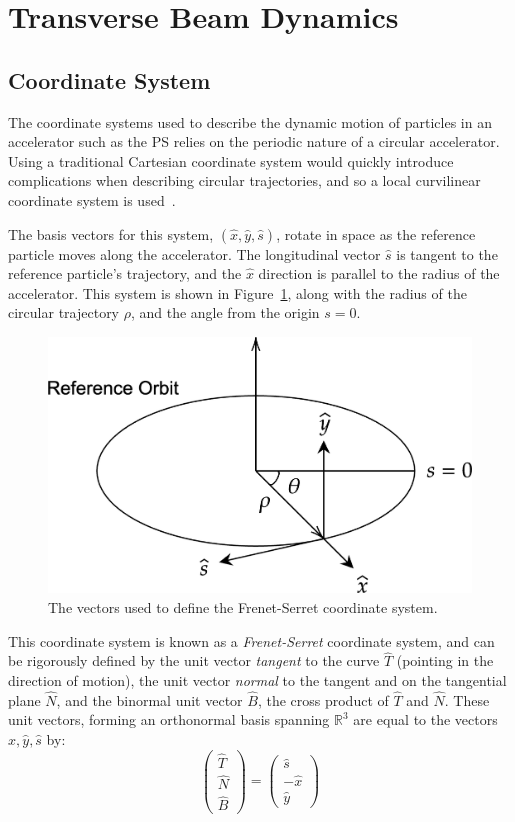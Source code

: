 \documentclass[11pt]{report}
\begin{document}
\section{Transverse Beam Dynamics}\label{sec:theory-transverse}

\subsection{Coordinate System}

The coordinate systems used to describe the dynamic motion of particles in an accelerator such as the PS relies on the periodic nature of a circular accelerator. Using a traditional Cartesian coordinate system would quickly introduce complications when describing circular trajectories, and so a local curvilinear coordinate system is used~\cite{BDSIM}.

The basis vectors for this system, $(\hat x, \hat y, \hat s)$, rotate in space as the reference particle moves along the accelerator. The longitudinal vector $\hat s$ is tangent to the reference particle's trajectory, and the $\hat x$ direction is parallel to the radius of the accelerator.  This system is shown in Figure~\ref{fig:frenet-serret}, along with the radius of the circular trajectory $\rho$, and the angle from the origin $s=0$. 

\begin{figure}[!h]
  \centering
  \includegraphics*[width=0.5\linewidth]{coordinate-system.png}
  \caption{The vectors used to define the Frenet-Serret coordinate system.}\label{fig:frenet-serret}
\end{figure}

This coordinate system is known as a {\it Frenet-Serret} coordinate system, and can be rigorously defined by the unit vector {\it tangent} to the curve $\hat T$ (pointing in the direction of motion), the unit vector {\it normal} to the tangent and on the tangential plane $\hat N$, and the binormal unit vector $\hat B$, the cross product of $\hat T$ and $\hat N$. These unit vectors, forming an orthonormal basis spanning $\mathbb{R}^3$ are equal to the vectors $\hat x, \hat y, \hat s$ by:
\begin{equation}
\begin{pmatrix}\hat T\\\hat N\\\hat B \end{pmatrix}=\begin{pmatrix}\hat s\\-\hat x\\\hat y \end{pmatrix}
\end{equation}
\end{document}

